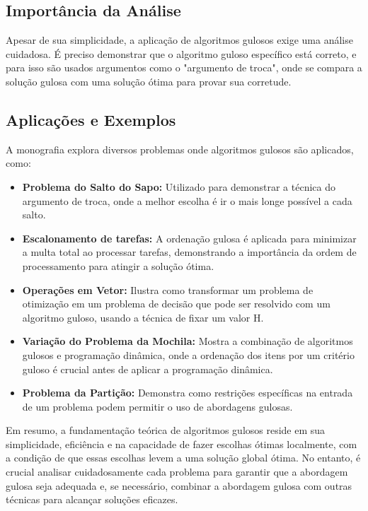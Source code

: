 \documentclass[12pt, a4paper]{report}
\begin{document}
\subsection*{Importância da Análise}
Apesar de sua simplicidade, a aplicação de algoritmos gulosos exige uma análise cuidadosa. É preciso demonstrar que o algoritmo guloso específico está correto, e para isso são usados argumentos como o "argumento de troca", onde se compara a solução gulosa com uma solução ótima para provar sua corretude.

\subsection*{Aplicações e Exemplos}
A monografia \cite{Colombo2018} explora diversos problemas onde algoritmos gulosos são aplicados, como:

\begin{itemize}
    \item \textbf{Problema do Salto do Sapo:} Utilizado para demonstrar a técnica do argumento de troca, onde a melhor escolha é ir o mais longe possível a cada salto.
    \item \textbf{Escalonamento de tarefas:} A ordenação gulosa é aplicada para minimizar a multa total ao processar tarefas, demonstrando a importância da ordem de processamento para atingir a solução ótima.
    \item \textbf{Operações em Vetor:} Ilustra como transformar um problema de otimização em um problema de decisão que pode ser resolvido com um algoritmo guloso, usando a técnica de fixar um valor H.
    \item \textbf{Variação do Problema da Mochila:} Mostra a combinação de algoritmos gulosos e programação dinâmica, onde a ordenação dos itens por um critério guloso é crucial antes de aplicar a programação dinâmica.
    \item \textbf{Problema da Partição:} Demonstra como restrições específicas na entrada de um problema podem permitir o uso de abordagens gulosas.
\end{itemize}

Em resumo, a fundamentação teórica de algoritmos gulosos reside em sua simplicidade, eficiência e na capacidade de fazer escolhas ótimas localmente, com a condição de que essas escolhas levem a uma solução global ótima. No entanto, é crucial analisar cuidadosamente cada problema para garantir que a abordagem gulosa seja adequada e, se necessário, combinar a abordagem gulosa com outras técnicas para alcançar soluções eficazes.
\end{document}
